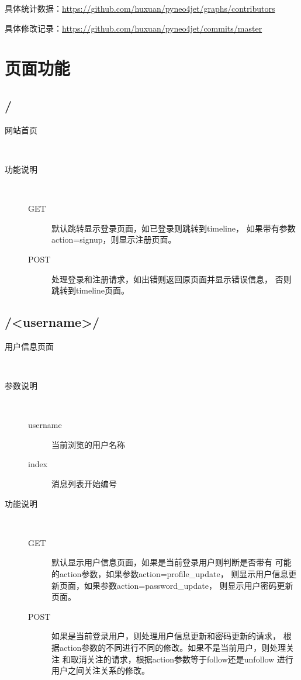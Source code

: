 \documentclass{yaldc}
\begin{document}
具体统计数据：\url{https://github.com/huxuan/pyneo4jet/graphs/contributors}

具体修改记录：\url{https://github.com/huxuan/pyneo4jet/commits/master}

\section{页面功能}

\subsection{/}

\begin{description}
    \item[网站首页] ~
    \item[功能说明] ~
        \begin{description}
            \item[GET] 默认跳转显示登录页面，如已登录则跳转到timeline，
                如果带有参数action=signup，则显示注册页面。
            \item[POST] 处理登录和注册请求，如出错则返回原页面并显示错误信息，
                否则跳转到timeline页面。
        \end{description}
\end{description}

\subsection{/<username>/}

\begin{description}
    \item[用户信息页面] ~
    \item[参数说明] ~
        \begin{description}
            \item[username] 当前浏览的用户名称
            \item[index] 消息列表开始编号
        \end{description}
    \item[功能说明] ~
        \begin{description}
            \item[GET] 默认显示用户信息页面，如果是当前登录用户则判断是否带有
                可能的action参数，如果参数action=profile\_update，
                则显示用户信息更新页面，如果参数action=password\_update，
                则显示用户密码更新页面。
            \item[POST] 如果是当前登录用户，则处理用户信息更新和密码更新的请求，
                根据action参数的不同进行不同的修改。如果不是当前用户，则处理关注
                和取消关注的请求，根据action参数等于follow还是unfollow
                进行用户之间关注关系的修改。
        \end{description}
\end{description}
\end{document}

